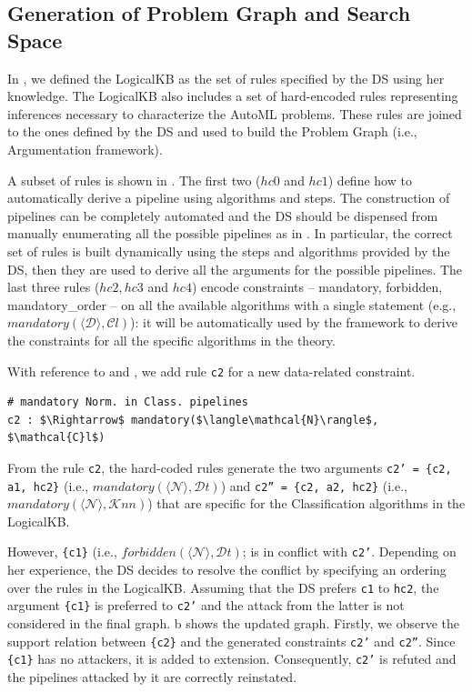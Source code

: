 \subsection{Generation of Problem Graph and Search Space}
In , we defined the LogicalKB as the set of rules specified by the DS using her knowledge.
The LogicalKB also includes a set of hard-encoded rules representing inferences necessary to characterize the AutoML problems.
These rules are joined to the ones defined by the DS and used to build the Problem Graph (i.e., Argumentation framework).

A subset of rules is shown in .
The first two ($hc0$ and $hc1$) define how to automatically derive a pipeline using algorithms and steps.
The construction of pipelines can be completely automated and the DS should be dispensed from manually enumerating all the possible pipelines as in .
In particular, the correct set of rules is built dynamically using the steps and algorithms provided by the DS, then they are used to derive all the arguments for the possible pipelines.
The last three rules ($hc2, hc3$ and $hc4$) encode constraints -- mandatory, forbidden, mandatory\_order -- on all the available algorithms with a single statement (e.g., $mandatory(\langle \mathcal{D} \rangle, \mathcal{C}l)$): it will be automatically used by the framework to derive the constraints for all the specific algorithms in the theory.

\begin{example}
With reference to  and , we add rule \texttt{c2} for a new data-related constraint.
\begin{lstlisting}[mathescape=true]
# mandatory Norm. in Class. pipelines
c2 : $\Rightarrow$ mandatory($\langle\mathcal{N}\rangle$, $\mathcal{C}l$)
\end{lstlisting}
From the rule \texttt{c2}, the hard-coded rules generate the two arguments
\texttt{c2' = \{c2, a1, hc2\}} (i.e., $mandatory(\langle\mathcal{N}\rangle, \mathcal{D}t)$) and \texttt{c2'' = \{c2, a2, hc2\}} (i.e., $mandatory(\langle\mathcal{N}\rangle, \mathcal{K}nn)$) that are specific for the Classification algorithms in the LogicalKB.

However, \texttt{\{c1\}} (i.e., $forbidden(\langle\mathcal{N}\rangle, \mathcal{D}t)$; is in conflict with \texttt{c2'}.
Depending on her experience, the DS decides to resolve the conflict by specifying an ordering over the rules in the LogicalKB.
Assuming that the DS prefers \texttt{c1} to \texttt{hc2},
the argument \texttt{\{c1\}} is preferred to \texttt{c2'} and the attack from the latter is not considered in the final graph.
b shows the updated graph.
Firstly, we observe the support relation between \texttt{\{c2\}} and the generated constraints \texttt{c2'} and \texttt{c2''}.
Since \texttt{\{c1\}} has no attackers, it is added to extension.
Consequently, \texttt{c2'} is refuted and the pipelines attacked by it are correctly reinstated.
\label{ex:hard_coded_rules}
\end{example}

